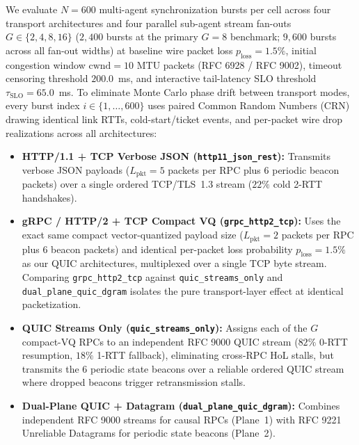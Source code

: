 \documentclass[11pt]{article}
\begin{document}
We evaluate $N = 600$ multi-agent synchronization bursts per cell across four transport architectures and four parallel sub-agent stream fan-outs $G \in \{2,\allowbreak 4,\allowbreak 8,\allowbreak 16\}$ ($2{,}400$ bursts at the primary $G=8$ benchmark; $9{,}600$ bursts across all fan-out widths) at baseline wire packet loss $p_{\mathrm{loss}} = 1.5\%$, initial congestion window $\mathrm{cwnd} = 10$ MTU packets (RFC 6928 / RFC 9002), timeout censoring threshold $200.0$~ms, and interactive tail-latency SLO threshold $\tau_{\mathrm{SLO}} = 65.0$~ms. To eliminate Monte Carlo phase drift between transport modes, every burst index $i \in \{1,\allowbreak \dots,\allowbreak 600\}$ uses paired Common Random Numbers (CRN) drawing identical link RTTs, cold-start/ticket events, and per-packet wire drop realizations across all architectures:
\begin{itemize}
  \item \textbf{HTTP/1.1 + TCP Verbose JSON (\texttt{http11\_\linebreak[0]json\_\linebreak[0]rest}):} Transmits verbose JSON payloads ($L_{\mathrm{pkt}} = 5$ packets per RPC plus $6$ periodic beacon packets) over a single ordered TCP/TLS~1.3 stream ($22\%$ cold 2-RTT handshakes).
  \item \textbf{gRPC / HTTP/2 + TCP Compact VQ (\texttt{grpc\_\linebreak[0]http2\_\linebreak[0]tcp}):} Uses the exact same compact vector-quantized payload size ($L_{\mathrm{pkt}} = 2$ packets per RPC plus $6$ beacon packets) and identical per-packet loss probability $p_{\mathrm{loss}} = 1.5\%$ as our QUIC architectures, multiplexed over a single TCP byte stream. Comparing \texttt{grpc\_\linebreak[0]http2\_\linebreak[0]tcp} against \texttt{quic\_\linebreak[0]streams\_\linebreak[0]only} and \texttt{dual\_\linebreak[0]plane\_\linebreak[0]quic\_\linebreak[0]dgram} isolates the pure transport-layer effect at identical packetization.
  \item \textbf{QUIC Streams Only (\texttt{quic\_\linebreak[0]streams\_\linebreak[0]only}):} Assigns each of the $G$ compact-VQ RPCs to an independent RFC 9000 QUIC stream ($82\%$ 0-RTT resumption, $18\%$ 1-RTT fallback), eliminating cross-RPC HoL stalls, but transmits the $6$ periodic state beacons over a reliable ordered QUIC stream where dropped beacons trigger retransmission stalls.
  \item \textbf{Dual-Plane QUIC + Datagram (\texttt{dual\_\linebreak[0]plane\_\linebreak[0]quic\_\linebreak[0]dgram}):} Combines independent RFC 9000 streams for causal RPCs (Plane~1) with RFC 9221 Unreliable Datagrams for periodic state beacons (Plane~2).
\end{itemize}
\end{document}
